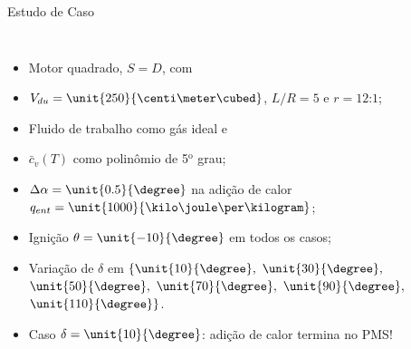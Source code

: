     \begin{frame}{Estudo de Caso}\vspace*{-2em}
        \begin{columns}
        \begin{itemize}
            \item<1-> Motor \alert{quadrado}, $S=D$, com
            \item<2-> \alert{$V_{du} = \unit{250}{\centi\meter\cubed}$}, $L/R = 5$ e \alert{$r =
                12$:$1$};
            \item<3-> Fluido de trabalho \alert{} como \alert{gás ideal} e
            \item<4-> $\bar{c}_v(T)$ como polinômio de \alert{5$^{\mathrm{o}}$ grau};
            \item<5-> \alert{$\Delta\alpha = \unit{0.5}{\degree}$} na adição de calor
                \alert{$q_{ent} = \unit{1000}{\kilo\joule\per\kilogram}$};
            \item<6-> Ignição \alert{$\theta = \unit{-10}{\degree}$} em todos os casos;
            \item<7-> Variação de \alert{$\delta$} em
                \alert{$\{
                    \unit{10}{\degree},$ $
                    \unit{30}{\degree},$ $
                    \unit{50}{\degree},$ $
                    \unit{70}{\degree},$ $
                    \unit{90}{\degree},$ $
                    \unit{110}{\degree}
                \}$}.
            \item<8-> Caso $\delta = \unit{10}{\degree}$: adição de calor termina no PMS!
        \end{itemize}
        \begin{center}
        \end{center}
        \end{columns}
    \end{frame}

